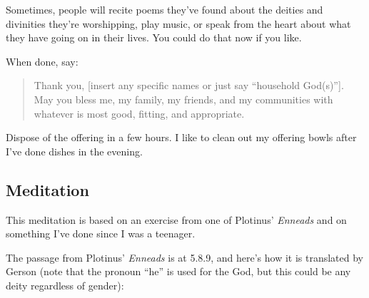 \documentclass[
]{book}
\begin{document}
Sometimes, people will recite poems they've found about the deities and divinities they're worshipping, play music, or speak from the heart about what they have going on in their lives. You could do that now if you like.

When done, say:

\begin{quote}
Thank you, {[}insert any specific names or just say ``household God(s)''{]}. May you bless me, my family, my friends, and my communities with whatever is most good, fitting, and appropriate.
\end{quote}

Dispose of the offering in a few hours. I like to clean out my offering bowls after I've done dishes in the evening.

\hypertarget{meditation}{%
\subsection{Meditation}\label{meditation}}

This meditation is based on an exercise from one of Plotinus' \emph{Enneads} and on something I've done since I was a teenager.

The passage from Plotinus' \emph{Enneads} is at 5.8.9, and here's how it is translated by Gerson (note that the pronoun ``he'' is used for the God, but this could be any deity regardless of gender):
\end{document}
